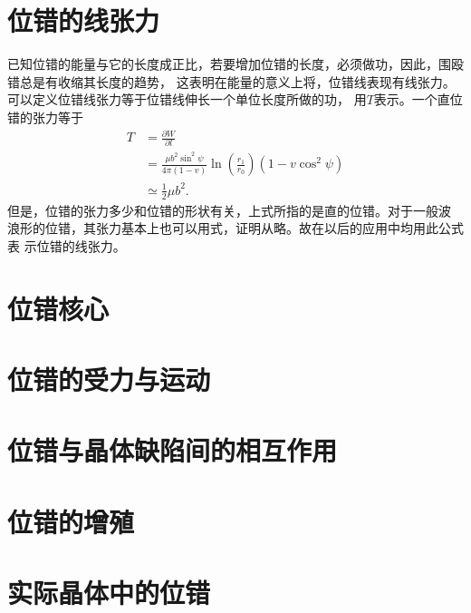         \section{位错的线张力}
            已知位错的能量与它的长度成正比，若要增加位错的长度，必须做功，因此，围殴错总是有收缩其长度的趋势，
            这表明在能量的意义上将，位错线表现有线张力。可以定义位错线张力等于位错线伸长一个单位长度所做的功，
            用$T$表示。一个直位错的张力等于
            \begin{equation}
                \begin{aligned}
                    T&=\frac{\partial W}{\partial l}\\
                    &=\frac{\mu b^{2} \sin ^{2} \psi}{4 \pi(1-v)} \ln \left(\frac{r_{1}}{r_{0}}\right)\left(1-v \cos ^{2} \psi\right)\\
                    &\simeq \frac{1}{2}\mu b^2.
                \end{aligned}
            \end{equation}
            但是，位错的张力多少和位错的形状有关，上式所指的是直的位错。对于一般波
            浪形的位错，其张力基本上也可以用式，证明从略。故在以后的应用中均用此公式表
            示位错的线张力。
        \section{位错核心}
            
        \section{位错的受力与运动}
        \section{位错与晶体缺陷间的相互作用}
        \section{位错的增殖}
        \section{实际晶体中的位错}
        